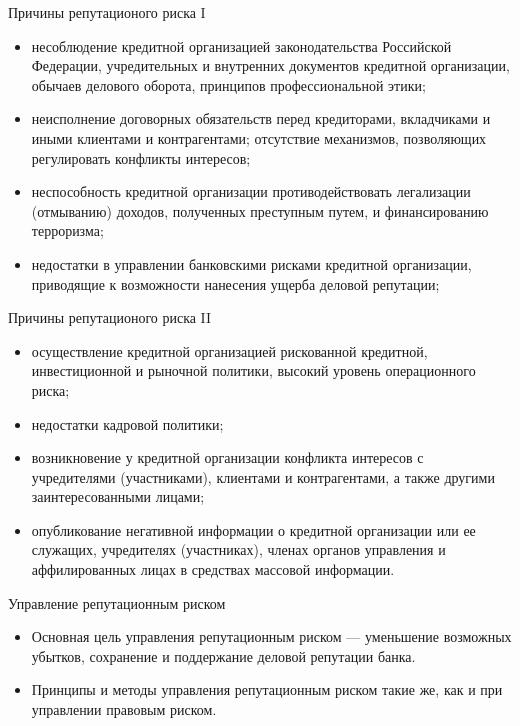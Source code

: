\documentclass[financial_risks_lectures.tex]{subfiles}
\begin{document}
\begin{frame}[shrink=15]{Причины репутационого риска I}
\begin{itemize}[<+->]
\item
несоблюдение кредитной организацией законодательства Российской Федерации, учредительных и внутренних документов кредитной организации, обычаев делового оборота, принципов профессиональной этики; 
\item
неисполнение договорных обязательств перед кредиторами, вкладчиками и иными клиентами и контрагентами;
отсутствие механизмов, позволяющих регулировать конфликты интересов;
\item
неспособность кредитной организации противодействовать легализации (отмыванию) доходов, полученных преступным путем, и финансированию терроризма;
\item
недостатки в управлении банковскими рисками кредитной организации, приводящие к возможности нанесения ущерба деловой репутации;
\end{itemize}
\end{frame}

\begin{frame}[shrink=15]{Причины репутационого риска II}
\begin{itemize}[<+->]
\item
осуществление кредитной организацией рискованной кредитной, инвестиционной и рыночной политики, высокий уровень операционного риска;
\item
недостатки кадровой политики;
\item
возникновение у кредитной организации конфликта интересов с учредителями (участниками), клиентами и контрагентами, а также другими заинтересованными лицами;
\item
опубликование негативной информации о кредитной организации или ее служащих, учредителях (участниках), членах органов управления и аффилированных лицах в средствах массовой информации.
\end{itemize}
\end{frame}


\begin{frame}{Управление репутационным риском}
\begin{itemize}[<+->]
\item
Основная цель управления репутационным риском — уменьшение возможных убытков, сохранение и поддержание деловой репутации банка.
\item
Принципы и методы управления репутационным риском такие же, как и при управлении правовым риском.
\end{itemize}
\end{frame}
\end{document}
